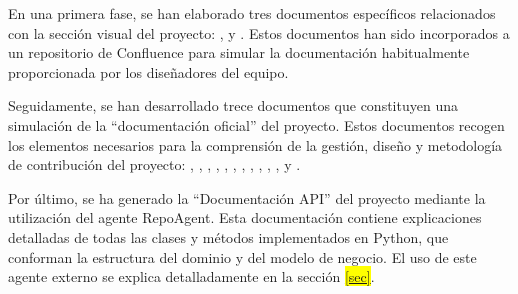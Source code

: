 En una primera fase, se han elaborado tres documentos específicos relacionados con la sección visual del proyecto: ,  y . Estos documentos han sido incorporados a un repositorio de Confluence para simular la documentación habitualmente proporcionada por los diseñadores del equipo.

Seguidamente, se han desarrollado trece documentos que constituyen una simulación de la ``documentación oficial'' del proyecto. Estos documentos recogen los elementos necesarios para la comprensión de la gestión, diseño y metodología de contribución del proyecto: , , , , , , , , , , ,  y .

Por último, se ha generado la ``Documentación API'' del proyecto mediante la utilización del agente RepoAgent\cite{luo_repoagent_2024}. Esta documentación contiene explicaciones detalladas de todas las clases y métodos implementados en Python, que conforman la estructura  del dominio y del modelo de negocio. El uso de este agente externo se explica detalladamente en la sección \colorbox{yellow}{\ref{sec}}.












